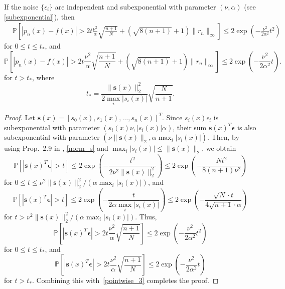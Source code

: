 \documentclass[final,onefignum,onetabnum]{siamart220329}
\newcommand{\vct}[1]{\bm{#1}}
\begin{document}
\begin{theorem}\label{thm:point2}  
	If the noise $ \{ \epsilon_i \}$ are independent and subexponential with parameter $(\nu,\alpha)$ (see \eqref{subexponential}), then 
	\begin{align*}
		& \mathbb{P} \left[ |p_n(x)-f(x)|>2 t \frac{\nu^2}{\alpha} \sqrt{\frac{n+1}{N}}+(\sqrt{8(n+1)} + 1) \|r_n\|_\infty \right]\leq 2 \exp \left( -\frac{\nu^2}{2 \alpha^2} t^2 \right)
	\end{align*}
	for $0 \leq t \leq t_*$, and
	\begin{equation*}\mathbb{P} \left[ |p_n(x)-f(x)|>2 t \frac{\nu^2}{\alpha} \sqrt{\frac{n+1}{N}}+(\sqrt{8(n+1)} + 1) \|r_n\|_\infty \right]\leq 2 \exp \left( -\frac{\nu^2}{2 \alpha^2} t \right). 
	\end{equation*}
	for $t > t_*$, where
	\[
	t_* = \frac{\|\vct{s}(x)\|_2^2}{2 \max_i |s_i(x)|} \sqrt{\frac{N}{n+1}}.
	\]
\end{theorem}
\begin{proof}  
	Let $\vct{s}(x)=[s_0(x),s_1(x),\dots,s_n(x)]^T$.
	Since $s_i (x) \epsilon_i$ is subexponential with parameter $(s_i(x) \nu,|s_i(x)| \alpha)$, their sum $\vct{s}(x)^T \vct{\epsilon}$ is also subexponential with parameter $(\nu \|\vct{s}(x)\|_2, \alpha \max_i |s_i(x)|)$.
	Then, by using Prop.~2.9 in \cite{wainwright2019high}, \eqref{norm_s} 
	and $\max_i |s_i(x)| \leq \| \vct{s}(x) \|_2$, we obtain 
	\[
	\mathbb{P}[|\vct{s}(x)^T \vct{\epsilon}|>t] \leq 2 \exp \left( -\frac{t^2}{2 \nu^2 \| \vct{s}(x) \|_2^2} \right) \leq 2 \exp \left( -\frac{N t^2}{8 (n+1) \nu^2} \right)
	\]
	for $0 \leq t \leq \nu^2 \|\vct{s}(x)\|_2^2/(\alpha \max_i |s_i(x)|)$, and
	\[
	\mathbb{P}[|\vct{s}(x)^T \vct{\epsilon}|>t] \leq 2 \exp \left( -\frac{t}{2 \alpha \max_i |s_i(x)|} \right) \leq 2 \exp \left( -\frac{\sqrt{N} \cdot t}{4 \sqrt{n+1} \cdot \alpha} \right)
	\]
	for $t > \nu^2 \|\vct{s}(x)\|_2^2/(\alpha \max_i |s_i(x)|)$.
	Thus,
	\[
	\mathbb{P} \left[|\vct{s}(x)^T \vct{\epsilon}|>2 t \frac{\nu^2}{\alpha} \sqrt{\frac{n+1}{N}} \right] \leq 2 \exp \left( -\frac{\nu^2}{2 \alpha^2} t^2 \right)
	\]
	for $0 \leq t \leq t_*$, and
	\[
	\mathbb{P} \left[|\vct{s}(x)^T \vct{\epsilon}|>2 t \frac{\nu^2}{\alpha} \sqrt{\frac{n+1}{N}} \right] \leq 2 \exp \left( -\frac{\nu^2}{2 \alpha^2} t \right)
	\]
	for $t > t_*$.
	Combining this with~\eqref{pointwise_3} completes the proof. 
\end{proof}
\end{document}
